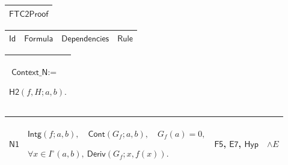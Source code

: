 \documentclass[11pt]{amsart}
\renewcommand{\arraystretch}{1.4}
\newlength{\FTCOneColumnBody}
\newlength{\FTCFourColumnBody}
\begin{document}
{\centering
\renewcommand{\arraystretch}{1.4}
\par\setlength{\parskip}{0pt}\nointerlineskip
\noindent
\begin{tabular}{|@{}>{\centering\arraybackslash}m{\FTCOneColumnBody}|}\hline
$\displaystyle \textsf{FTC2Proof}$\\ \hline
\end{tabular}%
\par\setlength{\parskip}{0pt}\nointerlineskip
\noindent
\begin{tabular}{|@{}>{\centering\arraybackslash}m{0.078431\FTCFourColumnBody}|>{\centering\arraybackslash}m{0.535947\FTCFourColumnBody}|>{\centering\arraybackslash}m{0.281045\FTCFourColumnBody}|>{\centering\arraybackslash}m{0.104575\FTCFourColumnBody}|}\hline
$\displaystyle \textsf{Id}$ & $\displaystyle \textsf{Formula}$ & $\displaystyle \textsf{Dependencies}$ & $\displaystyle \textsf{Rule}$\\ \hline
\end{tabular}%
\par\setlength{\parskip}{0pt}\nointerlineskip
\noindent
\begin{tabular}{|@{}>{\centering\arraybackslash}m{\FTCOneColumnBody}|}\hline
$\displaystyle \textsf{Context\_N}:=$\par
$\displaystyle \textsf{H2}(f,H;a,b).$\\ \hline
\end{tabular}%
\par\setlength{\parskip}{0pt}\nointerlineskip
\noindent
\begin{tabular}{|@{}>{\centering\arraybackslash}m{0.078431\FTCFourColumnBody}|>{\centering\arraybackslash}m{0.535947\FTCFourColumnBody}|>{\centering\arraybackslash}m{0.281045\FTCFourColumnBody}|>{\centering\arraybackslash}m{0.104575\FTCFourColumnBody}|}\hline
\hypertarget{proof:N1}{$\displaystyle \textsf{N1}$} & $\displaystyle \textsf{Intg}(f;a,b),\quad\textsf{Cont}(G_f;a,b),\quad G_f(a)=0,$\par
$\displaystyle \forall x\in I^\circ(a,b),\ \textsf{Deriv}(G_f;x,f(x)).$ & \hyperlink{proof:F5}{$\displaystyle \textsf{F5}$}, \hyperlink{proof:E7}{$\displaystyle \textsf{E7}$}, \hyperlink{def:Hyp}{$\displaystyle \textsf{Hyp}$} & $\displaystyle \land E$\\ \hline
\end{tabular}%
\par\setlength{\parskip}{0pt}\nointerlineskip
\noindent
\begin{tabular}{|@{}>{\centering\arraybackslash}m{0.078431\FTCFourColumnBody}|>{\centering\arraybackslash}m{0.535947\FTCFourColumnBody}|>{\centering\arraybackslash}m{0.281045\FTCFourColumnBody}|>{\centering\arraybackslash}m{0.104575\FTCFourColumnBody}|}\hline

\end{tabular}}
\end{document}

